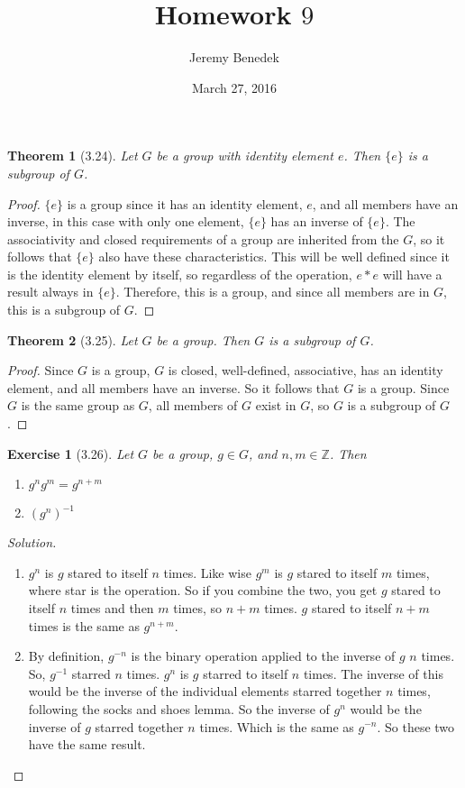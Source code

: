 \documentclass{article}
\title{Homework $9$}
\author{Jeremy Benedek}
\date{March 27, 2016}
\newtheorem*{thm}{Theorem}
\newtheorem*{ex}{Exercise}
\newenvironment{solution}
  {\begin{proof}[Solution]}
  {\renewcommand{\qedsymbol}{}\end{proof}}
\begin{document}
\maketitle

\begin{thm}[3.24]
	Let $G$ be a group with identity element $e$. Then $\{e\}$ is a subgroup of $G$. 
\end{thm}
\begin{proof}
	$\{e\}$ is a group since it has an identity element, $e$, and all members have an inverse, in this case with only one element, $\{e\}$ has
	an inverse of $\{e\}$. The associativity and closed requirements of a group are inherited from the $G$, so it follows that $\{e\}$ also
	have these characteristics. This will be well defined since it is the identity element by itself, so regardless of the operation, $e*e$ will
	have a result always in $\{e\}$. Therefore, this is a group, and since all members are in $G$, this is a subgroup of $G$.
\end{proof}

\begin{thm}[3.25]
	Let $G$ be a group. Then $G$ is a subgroup of $G$. 
\end{thm}
\begin{proof}
	Since $G$ is a group, $G$ is closed, well-defined, associative, has an identity element, and all members have an inverse. So it follows
	that $G$ is a group. Since $G$ is the same group as $G$, all members of $G$ exist in $G$, so $G$ is a subgroup of $G$.
\end{proof}

\begin{ex}[3.26]
	Let $G$ be a group, $g\in G$, and $n,m\in\mathbb{Z}$. Then \begin{enumerate}
	  \item $g^ng^m = g^{n+m}$
	  \item $(g^n)^{-1}$
	\end{enumerate}

\end{ex}
\begin{solution}
	\begin{enumerate}
	  \item $g^n$ is $g$ stared to itself $n$ times. Like wise $g^m$ is $g$ stared to itself $m$ times, where star is the operation. So if you
	    combine the two, you get $g$ stared to itself $n$ times and then $m$ times, so $n+m$ times. $g$ stared to itself $n+m$ times is
	    the same as $g^{n+m}$. 
	  \item By definition, $g^{-n}$ is the binary operation applied to the inverse of $g$ $n$ times. So, $g^{-1}$ starred $n$ times. $g^n$ is $g$ 
	    starred to itself $n$ times. The inverse of this would be the inverse of the individual elements starred together $n$ times, following
	    the socks and shoes lemma. So the inverse of $g^n$ would be the inverse of $g$ starred together $n$ times. Which is the same as $g^{-n}$.
	    So these two have the same result. 
	\end{enumerate}
\end{solution}
\end{document}
